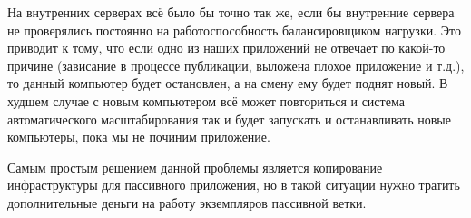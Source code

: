 	На внутренних серверах всё было бы точно так же, если бы внутренние сервера не проверялись постоянно на работоспособность балансировщиком нагрузки. Это приводит к тому, что если одно из наших приложений не отвечает по какой-то причине (зависание в процессе публикации, выложена плохое приложение и т.д.), то данный компьютер будет остановлен, а на смену ему будет поднят новый. В худшем случае с новым компьютером всё может повториться и система автоматического масштабирования так и будет запускать и останавливать новые компьютеры, пока мы не починим приложение.
	
	Самым простым решением данной проблемы является копирование инфраструктуры для пассивного приложения, но в такой ситуации нужно тратить дополнительные деньги на работу экземпляров пассивной ветки.